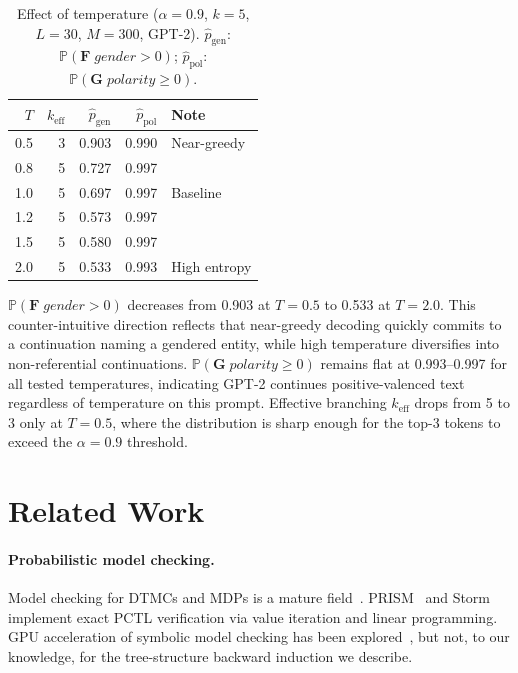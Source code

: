 \documentclass{article}
\newcommand{\Prob}{\mathbb{P}}
\begin{document}
\begin{table}[tb]
\centering
\small
\caption{Effect of temperature ($\alpha{=}0.9$, $k{=}5$, $L{=}30$,
$M{=}300$, GPT-2). $\hat{p}_\text{gen}$:
$\Prob(\mathbf{F}\;\textit{gender}{>}0)$;
$\hat{p}_\text{pol}$: $\Prob(\mathbf{G}\;\textit{polarity}{\ge}0)$.}
\label{tab:temperature}
\begin{tabular}{rrrrl}
\toprule
$T$ & $k_\text{eff}$ & $\hat{p}_\text{gen}$ & $\hat{p}_\text{pol}$ & Note \\
\midrule
0.5 & 3 & 0.903 & 0.990 & Near-greedy \\
0.8 & 5 & 0.727 & 0.997 & \\
1.0 & 5 & 0.697 & 0.997 & Baseline \\
1.2 & 5 & 0.573 & 0.997 & \\
1.5 & 5 & 0.580 & 0.997 & \\
2.0 & 5 & 0.533 & 0.993 & High entropy \\
\bottomrule
\end{tabular}
\end{table}

$\Prob(\mathbf{F}\;\textit{gender}{>}0)$ decreases from 0.903 at $T{=}0.5$ to
0.533 at $T{=}2.0$.
This counter-intuitive direction reflects that near-greedy decoding quickly
commits to a continuation naming a gendered entity, while high temperature
diversifies into non-referential continuations.
$\Prob(\mathbf{G}\;\textit{polarity}{\ge}0)$ remains flat at 0.993--0.997 for
all tested temperatures, indicating GPT-2 continues positive-valenced text
regardless of temperature on this prompt.
Effective branching $k_\text{eff}$ drops from 5 to 3 only at $T{=}0.5$, where
the distribution is sharp enough for the top-3 tokens to exceed the
$\alpha{=}0.9$ threshold.

\section{Related Work}
\label{sec:related}

\paragraph{Probabilistic model checking.}
Model checking for DTMCs and MDPs is a mature
field~\citep{baier2008principles}.
PRISM~\citep{kwiatkowska2011prism4} and Storm~\citep{hensel2022storm} implement
exact PCTL verification via value iteration and linear programming.
GPU acceleration of symbolic model checking has been explored~\citep{hermanns1999mtbdd},
but not, to our knowledge, for the tree-structure backward induction we describe.
\end{document}
